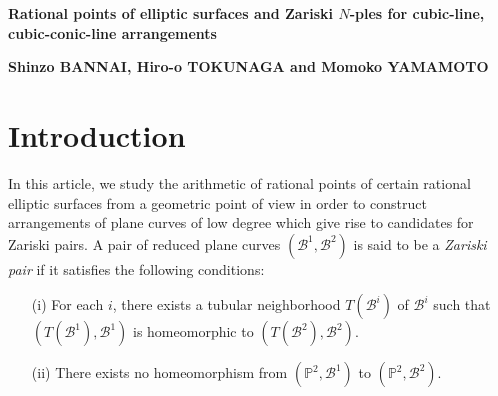 \documentclass{article}
\newcommand{\PP}{\mathbb P}
\newcommand{\mcB}{\mathcal B}
\begin{document}
  
  \begin{center}
{\Large \bf Rational points of elliptic surfaces 
and 
Zariski $N$-ples for cubic-line, cubic-conic-line arrangements
}

\bigskip



\bigskip
{\bf 
Shinzo BANNAI, Hiro-o TOKUNAGA and  Momoko YAMAMOTO
}

\end{center}
\normalsize

\begin{abstract}
In this paper, we continue the study of the relation between rational points of rational elliptic surfaces and plane curves. As an application, we give first examples of Zariski pairs of cubic-line arrangements that do not involve inflectional tangent lines.
\end{abstract}



\section*{Introduction}


  In this article, we study the arithmetic of  rational points of certain rational elliptic surfaces from a geometric point of view 
  in order to construct arrangements of plane curves of low degree which give  rise to candidates for Zariski pairs.
  A pair of reduced plane curves
  $(\mcB^1, \mcB^2)$ is said to be a {\it Zariski pair}
 if it satisfies the following conditions:

\begin{enumerate}

\item[(i)] For each $i$, there exists a tubular neighborhood $T(\mcB^i)$ of $\mcB^i$ such
that $(T(\mcB^1), \mcB^1)$ is homeomorphic to $(T(\mcB^2), \mcB^2)$.


\item[(ii)] There exists no homeomorphism from 
$(\PP^2, \mcB^1)$ to $(\PP^2, \mcB^2)$.
\end{enumerate}
\end{document}
